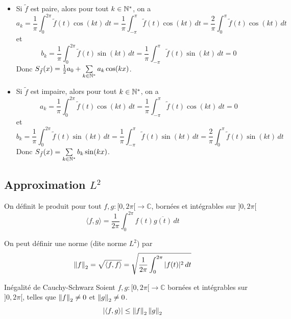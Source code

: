 \documentclass[a4paper,12pt]{article}
\begin{document}
\begin{demonstration}
    \begin{itemize}[label=\textbullet]
        \item 
        Si $\tilde{f}$ est paire, alors pour tout $k \in \mathbb{N}^*$, on a
        $$
        a_k = \frac{1}{\pi} \int_0^{2\pi} \tilde{f}(t) \cos(kt) \, dt = \frac{1}{\pi} \int_{-\pi}^{\pi} \tilde{f}(t) \cos(kt) \, dt = \frac{2}{\pi} \int_0^{\pi} \tilde{f}(t) \cos(kt) \, dt
        $$
        et
        $$
        b_k = \frac{1}{\pi} \int_0^{2\pi} \tilde{f}(t) \sin(kt) \, dt = \frac{1}{\pi} \int_{-\pi}^{\pi} \tilde{f}(t) \sin(kt) \, dt = 0
        $$
        Donc $S_{\tilde{f}}(x) = \frac{1}{2} a_0 + \sum\limits_{k \in \mathbb{N}^*} a_k \cos(kx)$.
    
    \item
    Si $\tilde{f}$ est impaire, alors pour tout $k \in \mathbb{N}^*$, on a
    $$
    a_k = \frac{1}{\pi} \int_0^{2\pi} \tilde{f}(t) \cos(kt) \, dt = \frac{1}{\pi} \int_{-\pi}^{\pi} \tilde{f}(t) \cos(kt) \, dt = 0
    $$
    et
    $$
    b_k = \frac{1}{\pi} \int_0^{2\pi} \tilde{f}(t) \sin(kt) \, dt = \frac{1}{\pi} \int_{-\pi}^{\pi} \tilde{f}(t) \sin(kt) \, dt = \frac{2}{\pi} \int_0^{\pi} \tilde{f}(t) \sin(kt) \, dt
    $$
    Donc $S_{\tilde{f}}(x) = \sum\limits_{k \in \mathbb{N}^*} b_k \sin(kx)$.
\end{itemize}

\end{demonstration}

\clearpage

\subsection{Approximation $L^2$}

\begin{definition}
    On définit le produit pour tout $f, g: [0, 2\pi[ \to \mathbb{C}$, bornées et intégrables sur $]0, 2\pi[$
    $$
    \langle f, g \rangle = \frac{1}{2\pi} \int_0^{2\pi} f(t) \overline{g(t)} \, dt
    $$

    On peut définir une norme (dite norme $L^2$) par
    $$
    \left\lVert f\right\rVert_2 = \sqrt{\langle f, f \rangle} = \sqrt{\frac{1}{2\pi} \int_0^{2\pi} |f(t)|^2 \, dt}
    $$
\end{definition}

\begin{lemme}{Inégalité de Cauchy-Schwarz}{}
    Soient $f, g: [0, 2\pi[ \to \mathbb{C}$ bornées et intégrables sur $]0, 2\pi[$, telles que $\left\lVert f\right\rVert_2 \neq 0$ et $\left\lVert g\right\rVert_2 \neq 0$.
    $$
    |\langle f, g \rangle| \leq \left\lVert f\right\rVert_2 \left\lVert g\right\rVert_2
    $$
\end{lemme}
\end{document}
